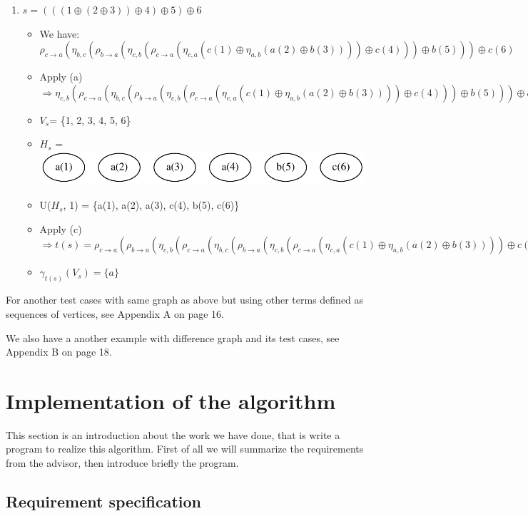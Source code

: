 \documentclass[a4paper, 12pt]{article}
\begin{document}
\begin{enumerate}
\item $s=(((1\oplus(2\oplus3))\oplus4)\oplus5)\oplus6$
\begin{itemize}
\item We have: $\rho_{c\rightarrow a}(\eta_{b,c}(\rho_{b\rightarrow a}(\eta_{c,b}(\rho_{c\rightarrow a}(\eta_{c,a}(c(1)\oplus\eta_{a,b}(a(2)\oplus b(3))))\oplus c(4)))\oplus b(5)))\oplus c(6)$
\item Apply (a) $\Longrightarrow\eta_{c,b}(\rho_{c\rightarrow a}(\eta_{b,c}(\rho_{b\rightarrow a}(\eta_{c,b}(\rho_{c\rightarrow a}(\eta_{c,a}(c(1)\oplus\eta_{a,b}(a(2)\oplus b(3))))\oplus c(4)))\oplus b(5)))\oplus c(6))$
\item {$V_s$}= \{1, 2, 3, 4, 5, 6\} 
\item {$H_s$} = \includegraphics[scale=0.5]{image/example7}
\item U({$H_s$}, 1) = \{a(1), a(2), a(3), c(4), b(5), c(6)\} 
\item Apply (c) $\Longrightarrow t(s)=\rho_{c\rightarrow a}(\rho_{b\rightarrow a}(\eta_{c,b}(\rho_{c\rightarrow a}(\eta_{b,c}(\rho_{b\rightarrow a}(\eta_{c,b}(\rho_{c\rightarrow a}(\eta_{c,a}(c(1)\oplus\eta_{a,b}(a(2)\oplus b(3))))\oplus c(4)))\oplus b(5)))\oplus c(6))))$ 
\item $\gamma_{t(s)}(V_{s})=\{a\}$ 
\end{itemize}
\end{enumerate}

For another test cases with same graph as above but using other terms defined as sequences of vertices, see Appendix A on page 16.

We also have a another example with difference graph and its test cases, see Appendix B on page 18.

\section {Implementation of the algorithm}
This section is an introduction about the work we have done, that is write a program to realize this algorithm. First of all we will summarize the requirements from the advisor, then introduce briefly the program.

\subsection{Requirement specification}
\end{document}
